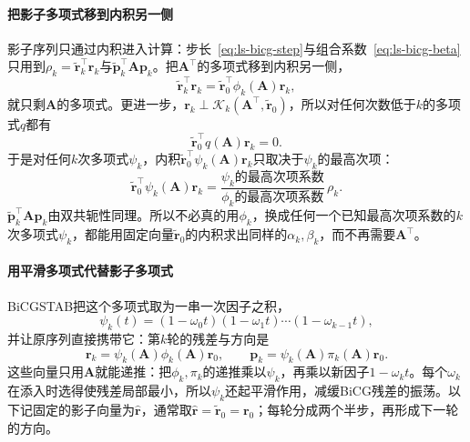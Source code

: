 \paragraph{把影子多项式移到内积另一侧}
影子序列只通过内积进入计算：步长~\eqref{eq:ls-bicg-step}与组合系数~\eqref{eq:ls-bicg-beta}只用到$\rho_k=\widetilde{\bm r}_k^\top\bm r_k$与$\widetilde{\bm p}_k^\top\bm A\bm p_k$。把$\bm A^\top$的多项式移到内积另一侧，
\[
 \widetilde{\bm r}_k^\top\bm r_k=\widetilde{\bm r}_0^\top\phi_k(\bm A)\bm r_k ,
\]
就只剩$\bm A$的多项式。更进一步，$\bm r_k\perp\mathcal K_k(\bm A^\top,\widetilde{\bm r}_0)$，所以对任何次数低于$k$的多项式$q$都有
\[
 \widetilde{\bm r}_0^\top q(\bm A)\bm r_k=0 .
\]
于是对任何$k$次多项式$\psi_k$，内积$\widetilde{\bm r}_0^\top\psi_k(\bm A)\bm r_k$只取决于$\psi_k$的最高次项：
\begin{equation}
 \widetilde{\bm r}_0^\top\psi_k(\bm A)\bm r_k=\frac{\text{$\psi_k$的最高次项系数}}{\text{$\phi_k$的最高次项系数}}\,\rho_k .
 \label{eq:ls-bicgstab-leading-coefficient}
\end{equation}
$\widetilde{\bm p}_k^\top\bm A\bm p_k$由双共轭性同理。所以不必真的用$\phi_k$，换成任何一个已知最高次项系数的$k$次多项式$\psi_k$，都能用固定向量$\widetilde{\bm r}_0$的内积求出同样的$\alpha_k,\beta_k$，而不再需要$\bm A^\top$。

\paragraph{用平滑多项式代替影子多项式}
BiCGSTAB把这个多项式取为一串一次因子之积，
\begin{equation}
 \psi_k(t)=(1-\omega_0t)(1-\omega_1t)\cdots(1-\omega_{k-1}t),
 \label{eq:ls-bicgstab-smoothing-polynomial}
\end{equation}
并让原序列直接携带它：第$k$轮的残差与方向是
\begin{equation}
 \bm r_k=\psi_k(\bm A)\phi_k(\bm A)\bm r_0,\qquad \bm p_k=\psi_k(\bm A)\pi_k(\bm A)\bm r_0 .
 \label{eq:ls-bicgstab-residual-polynomial}
\end{equation}
这些向量只用$\bm A$就能递推：把$\phi_k,\pi_k$的递推乘以$\psi_k$，再乘以新因子$1-\omega_kt$。每个$\omega_k$在添入时选得使残差局部最小，所以$\psi_k$还起平滑作用，减缓BiCG残差的振荡。以下记固定的影子向量为$\widehat{\bm r}$，通常取$\widehat{\bm r}=\widetilde{\bm r}_0=\bm r_0$；每轮分成两个半步，再形成下一轮的方向。

